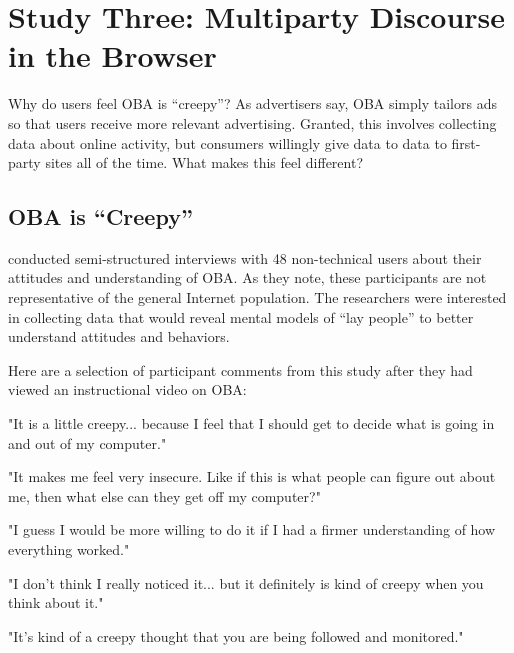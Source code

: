 \chapter{Study Three: Multiparty Discourse in the Browser}
\label{studythree:multipartydiscourseinthebrowser}

Why do users feel OBA is ``creepy''? As advertisers say, OBA simply tailors ads so that users receive more relevant advertising. Granted, this involves collecting data about online activity, but consumers willingly give data to data to first-party sites all of the time. What makes this feel different?

\section{OBA is ``Creepy''}
\label{obaiscreepy}

 \cite{Ur:2012ws}  conducted semi-structured interviews with 48 non-technical users about their attitudes and understanding of OBA. As they note, these participants are not representative of the general Internet population. The researchers were interested in collecting data that would reveal mental models of ``lay people'' to better understand attitudes and behaviors. 

Here are a selection of participant comments from this study after they had viewed an instructional video on OBA:


\vspace{10pt}
"It is a little creepy... because I feel that I should get to decide what is going in and out of my computer." \citep[p. 6]{Ur:2012ws}

\vspace{10pt}

"It makes me feel very insecure. Like if this is what people can figure out about me, then what else can they get off my computer?" \citep[p. 6]{Ur:2012ws}

\vspace{10pt}

"I guess I would be more willing to do it if I had a firmer understanding of how everything worked." \citep[p. 7]{Ur:2012ws}

\vspace{10pt}
"I don't think I really noticed it... but it definitely is kind of creepy when you think about it." \citep[p. 7]{Ur:2012ws}

\vspace{10pt}
"It's kind of a creepy thought that you are being followed and monitored." \citep[p. 7]{Ur:2012ws}

